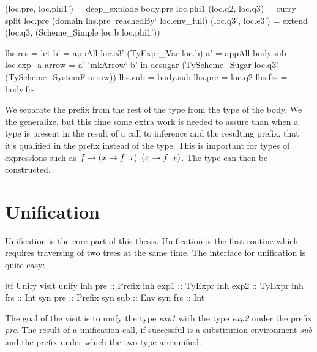\begin{code}
       (loc.pre, loc.phi1') = deep_explode body.pre loc.phi1
       (loc.q2,  loc.q3)  = curry split loc.pre (domain lhs.pre `reachedBy` loc.env_full)
       (loc.q3', loc.e3') = extend (loc.q3, (Scheme_Simple loc.b loc.phi1'))
       
       lhs.res = let b'    = appAll loc.e3' (TyExpr_Var loc.b)
                     a'    = appAll body.sub loc.exp_a
                     arrow = a' `mkArrow` b'
                 in desugar (TyScheme_Sugar loc.q3' (TyScheme_SystemF arrow))
       lhs.sub = body.sub
       lhs.pre = loc.q2
       lhs.frs = body.frs
\end{code}
We separate the prefix from the rest of the type from the type of the body. We the generalize, but this time some extra work is needed to assure than when a type is present in the result of a call to inference and the resulting prefix, that it's qualified in the prefix instead of the type. This is important for types of expressions such as $\\f \rightarrow (\\x \rightarrow f \hspace{5pt} x) \hspace{5pt} (\\x \rightarrow f \hspace{5pt} x)$. The type can then be constructed.

\section{Unification}
Unification is the core part of this thesis. Unification is the first routine which requires traversing of two trees at the same time. The interface for unification is quite easy:

\begin{code}
itf Unify
  visit unify
    inh pre  :: Prefix
    inh exp1 :: TyExpr
    inh exp2 :: TyExpr
    inh frs  :: Int
    syn pre  :: Prefix
    syn sub  :: Env
    syn frs  :: Int
\end{code}

The goal of the visit is to unify the type \emph{exp1} with the type \emph{exp2} under the prefix \emph{pre}. The result of a unification call, if successful is a substitution environment \emph{sub} and the prefix under which the two type are unified.

